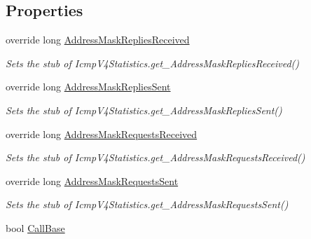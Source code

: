 \subsection*{Properties}
\begin{DoxyCompactItemize}
\item 
override long \hyperlink{class_system_1_1_net_1_1_network_information_1_1_fakes_1_1_stub_icmp_v4_statistics_a2ed6ac8ce44f2b1f238311f92b5e754a}{Address\-Mask\-Replies\-Received}
\begin{DoxyCompactList}\small\item\em Sets the stub of Icmp\-V4\-Statistics.\-get\-\_\-\-Address\-Mask\-Replies\-Received()\end{DoxyCompactList}\item 
override long \hyperlink{class_system_1_1_net_1_1_network_information_1_1_fakes_1_1_stub_icmp_v4_statistics_a73d4982be6f92d821ebd6c9f724c07b5}{Address\-Mask\-Replies\-Sent}
\begin{DoxyCompactList}\small\item\em Sets the stub of Icmp\-V4\-Statistics.\-get\-\_\-\-Address\-Mask\-Replies\-Sent()\end{DoxyCompactList}\item 
override long \hyperlink{class_system_1_1_net_1_1_network_information_1_1_fakes_1_1_stub_icmp_v4_statistics_aa0f87ecab63498ac6a2ca706b153502e}{Address\-Mask\-Requests\-Received}
\begin{DoxyCompactList}\small\item\em Sets the stub of Icmp\-V4\-Statistics.\-get\-\_\-\-Address\-Mask\-Requests\-Received()\end{DoxyCompactList}\item 
override long \hyperlink{class_system_1_1_net_1_1_network_information_1_1_fakes_1_1_stub_icmp_v4_statistics_aa94ccde3bcbe73019f10f5b42371bc3b}{Address\-Mask\-Requests\-Sent}
\begin{DoxyCompactList}\small\item\em Sets the stub of Icmp\-V4\-Statistics.\-get\-\_\-\-Address\-Mask\-Requests\-Sent()\end{DoxyCompactList}\item 
bool \hyperlink{class_system_1_1_net_1_1_network_information_1_1_fakes_1_1_stub_icmp_v4_statistics_abe2552d2610fe22fbc4222ae749f662f}{Call\-Base}

\end{DoxyCompactItemize}
